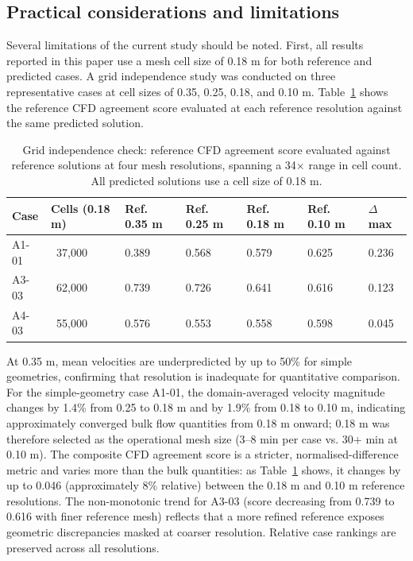 \documentclass[preprint,12pt,number]{elsarticle}
\begin{document}
\subsection{Practical considerations and limitations}
\label{sec:practical-considerations-and-limitations}


Several limitations of the current study should be noted. First, all results reported in this paper use a mesh cell size of 0.18 m for both reference and predicted cases. A grid independence study was conducted on three representative cases at cell sizes of 0.35, 0.25, 0.18, and 0.10 m. Table~\ref{tab:discuss-grid-independence} shows the reference CFD agreement score evaluated at each reference resolution against the same predicted solution.

\begin{table}[htbp]
\centering
\caption{Grid independence check: reference CFD agreement score evaluated against reference solutions at four mesh resolutions, spanning a 34$\times$ range in cell count. All predicted solutions use a cell size of 0.18 m.}
\label{tab:discuss-grid-independence}
\begin{tabular}{lllllll}
\toprule
Case & Cells (0.18 m) & Ref. 0.35 m & Ref. 0.25 m & Ref. 0.18 m & Ref. 0.10 m & $\Delta$ max \\
\midrule
A1-01 & ~37,000 & 0.389 & 0.568 & 0.579 & 0.625 & 0.236 \\
A3-03 & ~62,000 & 0.739 & 0.726 & 0.641 & 0.616 & 0.123 \\
A4-03 & ~55,000 & 0.576 & 0.553 & 0.558 & 0.598 & 0.045 \\
\bottomrule
\end{tabular}
\end{table}


At 0.35 m, mean velocities are underpredicted by up to 50\% for simple geometries, confirming that resolution is inadequate for quantitative comparison. For the simple-geometry case A1-01, the domain-averaged velocity magnitude changes by 1.4\% from 0.25 to 0.18 m and by 1.9\% from 0.18 to 0.10 m, indicating approximately converged bulk flow quantities from 0.18 m onward; 0.18 m was therefore selected as the operational mesh size (3--8 min per case vs. 30+ min at 0.10 m). The composite CFD agreement score is a stricter, normalised-difference metric and varies more than the bulk quantities: as Table~\ref{tab:discuss-grid-independence} shows, it changes by up to 0.046 (approximately 8\% relative) between the 0.18 m and 0.10 m reference resolutions. The non-monotonic trend for A3-03 (score decreasing from 0.739 to 0.616 with finer reference mesh) reflects that a more refined reference exposes geometric discrepancies masked at coarser resolution. Relative case rankings are preserved across all resolutions.
\end{document}
